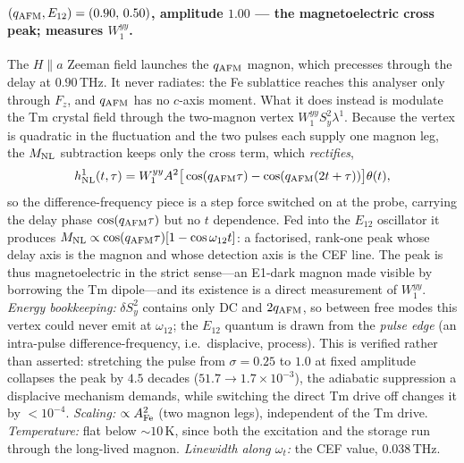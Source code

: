 \documentclass[11pt]{article}
\newcommand{\qafm}{q_{\rm AFM}}
\begin{document}
\paragraph{$(\qafm,E_{12})=(0.90,\,0.50)$, amplitude $1.00$ --- the
magnetoelectric cross peak; measures $W^{yy}_1$.}
The $H\!\parallel\!a$ Zeeman field launches the $\qafm$ magnon, which
precesses through the delay at $0.90$\,THz.  It never radiates: the Fe
sublattice reaches this analyser only through $F_z$, and $\qafm$ has no
$c$-axis moment.  What it does instead is
modulate the Tm crystal field through the two-magnon vertex
$W^{yy}_1S_y^2\lambda^1$.  Because the vertex is quadratic in the
fluctuation and the two pulses each supply one magnon leg, the
$M_{\rm NL}$ subtraction keeps only the cross term, which
\emph{rectifies},
\begin{equation}
  h^1_{\rm NL}(t,\tau)=W^{yy}_1A^2\big[\cos(\qafm\tau)
  -\cos(\qafm(2t+\tau))\big]\theta(t),
\end{equation}
so the difference-frequency piece is a step force switched on at the
probe, carrying the delay phase $\cos(\qafm\tau)$ but no $t$
dependence.  Fed into the $E_{12}$ oscillator it produces
$M_{\rm NL}\propto\cos(\qafm\tau)[1-\cos\omega_{12}t]$: a factorised,
rank-one peak whose delay axis is the magnon and whose detection axis
is the CEF line.  The peak is thus magnetoelectric in the strict
sense---an E1-dark magnon made visible by borrowing the Tm dipole---and
its existence is a direct measurement of $W^{yy}_1$.
\emph{Energy bookkeeping:} $\delta S_y^2$ contains only DC and
$2\qafm$, so between free modes this vertex could never emit at
$\omega_{12}$; the $E_{12}$ quantum is drawn from the \emph{pulse edge}
(an intra-pulse difference-frequency, i.e.\ displacive, process).  This
is verified rather than asserted: stretching the pulse from
$\sigma=0.25$ to $1.0$ at fixed amplitude collapses the peak by $4.5$
decades ($51.7\to1.7\times10^{-3}$), the adiabatic suppression a
displacive mechanism demands, while switching the direct Tm drive off
changes it by $<10^{-4}$.
\emph{Scaling:} $\propto A_{\rm Fe}^2$ (two magnon legs), independent
of the Tm drive.  \emph{Temperature:} flat below $\sim10$\,K, since
both the excitation and the storage run through the long-lived magnon.
\emph{Linewidth along $\omega_t$:} the CEF value, $0.038$\,THz.
\end{document}

